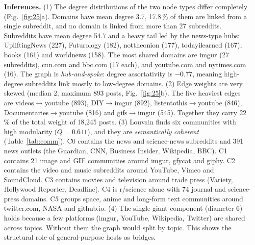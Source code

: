 \textbf{Inferences.}
(1) The degree distributions of the two node types differ completely (Fig.~\ref{fig:25}a). Domains have mean degree 3.7,
17.8\,\% of them are linked from a single subreddit, and no domain is linked from more than 27 subreddits. Subreddits have
mean degree 54.7 and a heavy tail led by the news-type hubs: UpliftingNews (227), Futurology (182), nottheonion (177),
todayilearned (167), books (161) and worldnews (158). The most shared domains are imgur (27 subreddits), cnn.com and
bbc.com (17 each), and youtube.com and nytimes.com (16). The graph is \emph{hub-and-spoke}: degree
assortativity is $-0.77$, meaning high-degree subreddits link mostly to low-degree domains.
(2) Edge weights are very skewed (median 2, maximum 893 posts, Fig.~\ref{fig:25}b). The five heaviest edges are videos$\rightarrow$youtube (893),
DIY$\rightarrow$imgur (892), listentothis$\rightarrow$youtube (846), Documentaries$\rightarrow$youtube (816) and
gifs$\rightarrow$imgur (545). Together they carry 22\,\% of the total weight of 18,245 posts.
(3) Louvain finds six communities with high modularity ($Q=0.611$), and they are \emph{semantically coherent}
(Table~\ref{tab:comm}). C0 contains the news and science-news subreddits and 391 news outlets (the Guardian, CNN, Business
Insider, Wikipedia, BBC). C1 contains 21 image and GIF communities around imgur, gfycat and giphy. C2 contains the video and
music subreddits around YouTube, Vimeo and SoundCloud. C3 contains movies and television around trade press (Variety,
Hollywood Reporter, Deadline). C4 is r/science alone with 74 journal and science-press domains. C5 groups space, anime and
long-form text communities around twitter.com, NASA and github.io.
(4) The single giant component (diameter 6) holds because a few platforms (imgur, YouTube, Wikipedia, Twitter) are shared
across topics. Without them the graph would split by topic. This shows the structural role of general-purpose hosts as
bridges.

